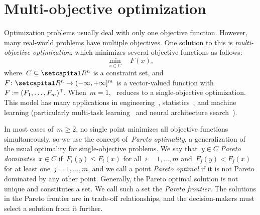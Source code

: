 \documentclass[../../main]{subfiles}
\begin{document}
\section{Multi-objective optimization} 
Optimization problems usually deal with only one objective function.
However, many real-world problems have multiple objectives.
One solution to this is \emph{multi-objective optimization}, which minimizes several objective functions as follows:
\begin{equation} \label{eq:MOO}
    \min_{x \in C} \quad F(x)
    ,\end{equation}
where~$C \subseteq \setR^n$ is a constraint set, and $F \colon \setR^n \to (-\infty, +\infty]^m$ is a vector-valued function with~$F \coloneqq (F_1, \dots, F_m)^\top\hspace{-1pt}$.
When~$m = 1$,~ reduces to a single-objective optimization.
This model has many applications in engineering~\cite{Eschenauer1990}, statistics~\cite{Carrizosa1998}, and machine learning (particularly multi-task learning~\cite{Sener2018,Lin2019} and neural architecture search~\cite{Kim2017,Dong2018,Elsken2019}).

In most cases of~$m \ge 2$, no single point minimizes all objective functions simultaneously, so we use the concept of~\emph{Pareto optimality}, a generalization of the usual optimality for single-objective problems.
We say that~$y \in C$ \emph{Pareto dominates}~$x \in C$ if~$F_i(y) \le F_i(x)$ for all~$i = 1, \dots, m$ and~$F_j(y) < F_j(x)$ for at least one~$j = 1, \dots, m$, and we call a point \emph{Pareto optimal} if it is not Pareto dominated by any other point.
Generally, the Pareto optimal solution is not unique and constitutes a set.
We call such a set the \emph{Pareto frontier}.
The solutions in the Pareto frontier are in trade-off relationships, and the decision-makers must select a solution from it further.






\end{document}
